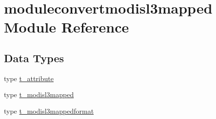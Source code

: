 \hypertarget{namespacemoduleconvertmodisl3mapped}{}\section{moduleconvertmodisl3mapped Module Reference}
\label{namespacemoduleconvertmodisl3mapped}
\subsection*{Data Types}
\begin{DoxyCompactItemize}
\item 
type \mbox{\hyperlink{structmoduleconvertmodisl3mapped_1_1t__attribute}{t\+\_\+attribute}}
\item 
type \mbox{\hyperlink{structmoduleconvertmodisl3mapped_1_1t__modisl3mapped}{t\+\_\+modisl3mapped}}
\item 
type \mbox{\hyperlink{structmoduleconvertmodisl3mapped_1_1t__modisl3mappedformat}{t\+\_\+modisl3mappedformat}}
\end{DoxyCompactItemize}

